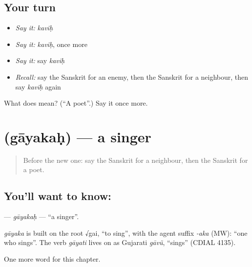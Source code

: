 \subsection*{Your turn}
\begin{itemize}
\raggedright
  \item \emph{Say it:} \emph{kaviḥ}
  \item \emph{Say it:} \emph{kaviḥ}, once more
  \item \emph{Say it:} say \emph{kaviḥ}
  \item \emph{Recall:} say the Sanskrit for an enemy, then the Sanskrit for a neighbour, then say \emph{kaviḥ} again
\end{itemize}

\begin{tcolorbox}[breakable,colback=teal!4,colframe=teal!35!black,title={Before you move on}]
What does  mean? (\textquotedblleft{}A poet\textquotedblright{}.) Say it once more.
\end{tcolorbox}
\section[\texorpdfstring{\sk{गायकः} (gāyakaḥ)}{गायकः (gāyakaḥ)}]{ (gāyakaḥ) — a singer}

\label{lesson:SA-C209-gayakah}



\begin{quote}
Before the new one: say the Sanskrit for a neighbour, then the Sanskrit for a poet.
\end{quote}

\subsection*{You'll want to know: }
\textbf{} — \emph{gāyakaḥ} — \textquotedblleft{}a singer\textquotedblright{}.

\begin{cousinweb}
\emph{gāyaka} is built on the root √gai, \textquotedblleft{}to sing\textquotedblright{}, with the agent suffix \emph{-aka} (MW): \textquotedblleft{}one who sings\textquotedblright{}. The verb \emph{gāyati} lives on as Gujarati \emph{gāvũ}, \textquotedblleft{}sings\textquotedblright{} (CDIAL 4135).
\end{cousinweb}

\begin{grammarlens}[title={What you've built}]
One more word for this chapter.
\end{grammarlens}

